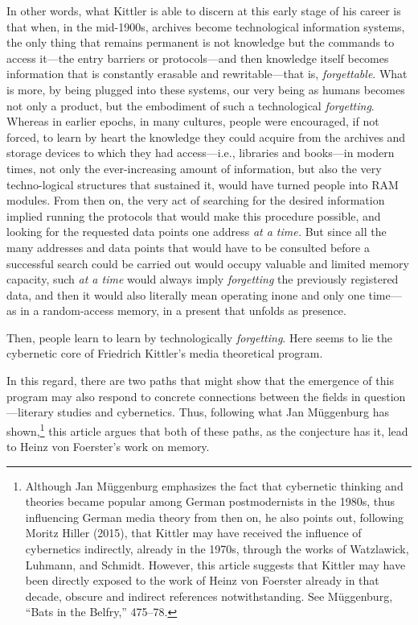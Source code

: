 \documentclass{tufte-handout}
\begin{document}
\noindent In other words, what Kittler is able to discern at this early stage of
his career is that when, in the mid-1900s, archives become technological
information systems, the only thing that remains permanent is not
knowledge but the commands to access it---the entry barriers or
protocols---and then knowledge itself becomes information that is
constantly erasable and rewritable---that is, \emph{forgettable}. What
is more, by being plugged into these systems, our very being as humans
becomes not only a product, but the embodiment of such a technological
\emph{forgetting}. Whereas in earlier epochs, in many cultures, people
were encouraged, if not forced, to learn by heart the knowledge they
could acquire from the archives and storage devices to which they had
access---i.e., libraries and books---in modern times, not only the
ever-increasing amount of information, but also the very techno-logical
structures that sustained it, would have turned people into RAM modules.
From then on, the very act of searching for the desired information
implied running the protocols that would make this procedure possible,
and looking for the requested data points one address \emph{at a time.}
But since all the many addresses and data points that would have to be
consulted before a successful search could be carried out would occupy
valuable and limited memory capacity, such \emph{at a time} would always
imply \emph{forgetting} the previously registered data, and then it
would also literally mean operating in\newpage\noindent one and only one time---as in a
random-access memory, in a present that unfolds as presence.

Then, people learn to learn by technologically \emph{forgetting}. Here
seems to lie the cybernetic core of Friedrich Kittler's media
theoretical program.

In this regard, there are two paths that might show that the emergence
of this program may also respond to concrete connections between the
fields in question---literary studies and cybernetics. Thus, following
what Jan Müggenburg has shown,\footnote{Although Jan Müggenburg
  emphasizes the fact that cybernetic thinking and theories became
  popular among German postmodernists in the 1980s, thus influencing
  German media theory from then on, he also points out, following Moritz
  Hiller (2015), that Kittler may have received the influence of
  cybernetics indirectly, already in the 1970s, through the works of
  Watzlawick, Luhmann, and Schmidt. However, this article suggests that
  Kittler may have been directly exposed to the work of Heinz von
  Foerster already in that decade, obscure and indirect references
  notwithstanding. See Müggenburg, ``Bats in the Belfry,'' 475--78.}
this article argues that both of these paths, as the conjecture has it,
lead to Heinz von Foerster's work on memory.
\end{document}
